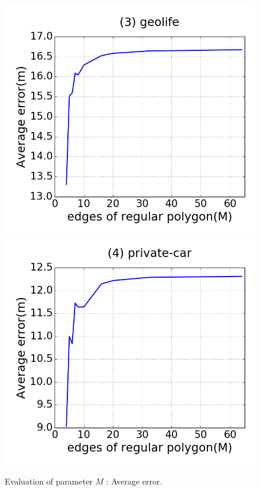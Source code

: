 \begin{figure}[tb!]
\includegraphics[scale = 0.25]{figures/Exp-M-error-geolife.png}
\includegraphics[scale = 0.25]{figures/Exp-M-error-private.png}
\vspace{-3ex}
\caption{\small Evaluation of parameter $M$ : Average error.}
\label{fig:m-error}
\vspace{-1ex}
\end{figure}


